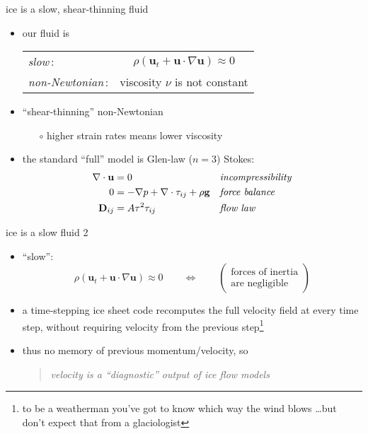 \begin{frame}{ice is a slow, shear-thinning fluid}

\begin{itemize}
\item our fluid is

\smallskip
  \begin{tabular}{lc}
  \emph{slow}\,: & $\rho \left(\mathbf{u}_t + \mathbf{u}\cdot\nabla \mathbf{u}\right) \approx 0$ \\
  \emph{non-Newtonian}\,: & viscosity $\nu$ is not constant
  \end{tabular}
\item ``shear-thinning'' non-Newtonian
  \begin{itemize}
  \item[$\circ$] higher strain rates means lower viscosity
  \end{itemize}

\bigskip
\item the standard ``full'' model is Glen-law ($n=3$) Stokes:
\begin{align*}
\nabla \cdot \mathbf{u} &= 0 &&\text{\emph{incompressibility}} \\
0 &= - \nabla p + \nabla \cdot \tau_{ij} + \rho \mathbf{g} &&\text{\emph{force balance}} \\
\mathbf{D}_{ij} &= A \tau^2 \tau_{ij} &&\text{\emph{flow law}}
\end{align*}

\end{itemize}
\end{frame}


\begin{frame}{ice is a slow fluid 2}

\begin{itemize}
\item ``slow'':
  $$\rho \left(\mathbf{u}_t + \mathbf{u}\cdot\nabla \mathbf{u}\right) \approx 0 \qquad \iff \qquad \begin{pmatrix} \text{forces of inertia} \\ \text{are negligible} \end{pmatrix}$$
\item a time-stepping ice sheet code recomputes the full velocity field at every time step, without requiring velocity from the previous step\footnote{to be a weatherman you've got to know which way the wind blows \dots but don't expect that from a glaciologist}
\item thus no memory of previous momentum/velocity, so
  \begin{quote}\emph{velocity is a ``diagnostic'' output of ice flow models}\end{quote}
\end{itemize}
\end{frame}


